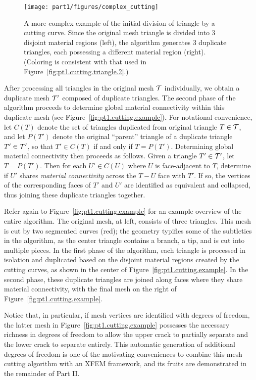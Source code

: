 \setlength{\figureheight}{0.25\columnwidth}
\begin{figure}[htbp]
\begin{center}
\texttt{[image: part1/figures/complex\_cutting]}
\caption{A more complex example of the initial division of triangle by a cutting curve. Since the original mesh triangle is divided into $3$ disjoint material regions (left), the algorithm generates $3$ duplicate triangles, each possessing a different material region (right). (Coloring is consistent with that used in Figure~\ref{fig:pt1.cutting.triangle.2}.)}
\label{fig:pt1.cutting.triangle.3}
\end{center}
\end{figure}

After processing all triangles in the original mesh $\mathcal{T}$ individually, we obtain a duplicate mesh $\mathcal{T}'$ composed of duplicate triangles. The second phase of the algorithm proceeds to determine global material connectivity within this duplicate mesh (see Figure~\ref{fig:pt1.cutting.example}). For notational convenience, let $C(T)$ denote the set of triangles duplicated from original triangle $T \in \mathcal{T}$, and let $P(T')$ denote the original ``parent'' triangle of a duplicate triangle $T' \in \mathcal{T}'$, so that $T' \in C(T)$ if and only if $T = P(T')$. Determining global material connectivity then proceeds as follows. Given a triangle $T' \in \mathcal{T}'$, let $T = P(T')$. Then for each $U' \in C(U)$ where $U$ is face-adjacent to $T$, determine if $U'$ shares \emph{material connectivity} across the $T-U$ face with $T'$. If so, the vertices of the corresponding faces of $T'$ and $U'$ are identified as equivalent and collapsed, thus joining these duplicate triangles together.

Refer again to Figure~\ref{fig:pt1.cutting.example} for an example overview of the entire algorithm. The original mesh, at left, consists of three triangles. This mesh is cut by two segmented curves (red); the geometry typifies some of the subtleties in the algorithm, as the center triangle contains a branch, a tip, and is cut into multiple pieces. In the first phase of the algorithm, each triangle is processed in isolation and duplicated based on the disjoint material regions created by the cutting curves, as shown in the center of Figure~\ref{fig:pt1.cutting.example}. In the second phase, these duplicate triangles are joined along faces where they share material connectivity, with the final mesh on the right of Figure~\ref{fig:pt1.cutting.example}.

Notice that, in particular, if mesh vertices are identified with degrees of freedom, the latter mesh in Figure~\ref{fig:pt1.cutting.example} possesses the necessary richness in degrees of freedom to allow the upper crack to partially separate and the lower crack to separate entirely. This automatic generation of additional degrees of freedom is one of the motivating conveniences to combine this mesh cutting algorithm with an XFEM framework, and its fruits are demonstrated in the remainder of Part II.

\renewcommand{\thechapter}{\arabic{chapter}}
